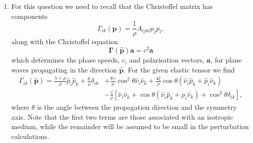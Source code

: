 \documentclass[a4paper,10pt]{paper}
\begin{document}
\begin{enumerate}
If the initial stress does not vanish, the elastic tensor takes the form
\begin{equation*}
    A_{ijkl}=4\frac{\partial^{2}U}{\partial C_{ij}\partial C_{kl}}+\delta_{ik}\sigma_{lj}
\end{equation*}
where $\sigma_{ij}=2\frac{\partial U}{\partial C_{ij}}$ is the (symmetric) equilibrium stress. Here the first term on the right has the full elastic symmetries, but the term depending on the equilibrium stress only obeys the hyperelastic symmetry. Thus, in a pre-stressed medium the elastic tensor loses some of its symmetries. Moreover, it can be shown that for a non-hydrostatic equilibrium stress, the second term is associated with anisotropy.

\item For this question we need to recall that the Christoffel matrix has components
\begin{equation*}
    \Gamma_{ik}(\mathbf{p})=\frac{1}{\rho}A_{ijkl}p_{j}p_{l},
\end{equation*}
along with the Christoffel equation
\begin{equation*}
    \boldsymbol{\Gamma}(\hat{\mathbf{p}})\mathbf{a}=c^{2}\mathbf{a}
\end{equation*}
which determines the phase speeds, $c$, and polarisation vectors, $\mathbf{a}$, for plane waves propagating in the direction $\hat{\mathbf{p}}$. For the given elastic tensor we find
\begin{align*}
    \Gamma_{ik}(\hat{\mathbf{p}}) = \frac{\lambda+\mu}{\rho}\hat{p}_{i}\hat{p}_{k}+\frac{\mu}{\rho}\delta_{ik} &+ \frac{8\gamma}{\rho}\cos^{2}\theta\hat{\nu}_{i}\hat{\nu}_{k}+\frac{4\xi}{\rho}\cos\theta(\hat{\nu}_{i}\hat{p}_{k}+\hat{p}_{i}\hat{\nu}_{k}) \\
    &-\frac{\zeta}{\rho}[\hat{\nu}_{i}\hat{\nu}_{k}+\cos\theta(\hat{\nu}_{i}\hat{p}_{k}+\hat{p}_{i}\hat{\nu}_{k})+\cos^{2}\theta\delta_{ik}],
\end{align*}
where $\theta$ is the angle between the propagation direction and the symmetry axis. Note that the first two terms are those associated with an isotropic medium, while the remainder will be assumed to be small in the perturbation calculations.


\end{enumerate}
\end{document}
